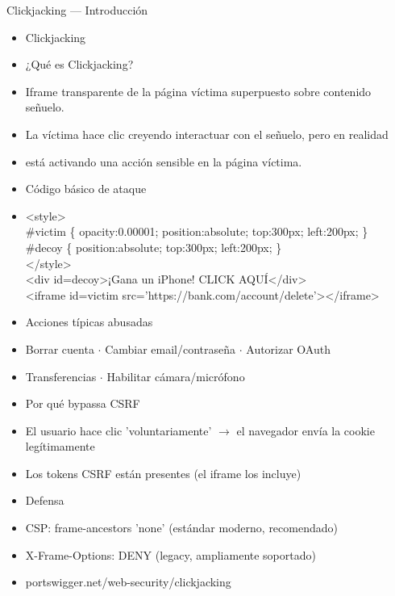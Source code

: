 \documentclass[aspectratio=169,10pt]{beamer}
\newcommand{\cmdbox}[1]{%
  \begin{center}%
  {\setlength{\fboxsep}{6pt}\colorbox{uzlav!40}{\parbox{0.88\linewidth}{\ttfamily\footnotesize #1}}}%
  \end{center}}
\begin{document}
\begin{frame}[allowframebreaks]{Clickjacking --- Introducción}
\small
  \begin{itemize}
  \item Clickjacking
  \item ¿Qué es Clickjacking?
  \item Iframe transparente de la página víctima superpuesto sobre contenido señuelo.
  \item La víctima hace clic creyendo interactuar con el señuelo, pero en realidad
  \item está activando una acción sensible en la página víctima.
  \item Código básico de ataque
  \item[] \cmdbox{\textless{}style\textgreater{}\\{}
\#victim \{ opacity:0.00001; position:absolute; top:300px; left:200px; \}\\{}
\#decoy \{ position:absolute; top:300px; left:200px; \}\\{}
\textless{}/style\textgreater{}\\{}
\textless{}div id=decoy\textgreater{}¡Gana un iPhone! CLICK AQUÍ\textless{}/div\textgreater{}\\{}
\textless{}iframe id=victim src='https://bank.com/account/delete'\textgreater{}\textless{}/iframe\textgreater{}}
  \item Acciones típicas abusadas
  \item Borrar cuenta $\cdot$ Cambiar email/contraseña $\cdot$ Autorizar OAuth
  \item Transferencias $\cdot$ Habilitar cámara/micrófono
  \item Por qué bypassa CSRF
  \item El usuario hace clic 'voluntariamente' $\rightarrow$ el navegador envía la cookie legítimamente
  \item Los tokens CSRF están presentes (el iframe los incluye)
  \item Defensa
  \item CSP: frame-ancestors 'none' (estándar moderno, recomendado)
  \item X-Frame-Options: DENY (legacy, ampliamente soportado)
  \item portswigger.net/web-security/clickjacking
  \end{itemize}
\end{frame}
\end{document}
